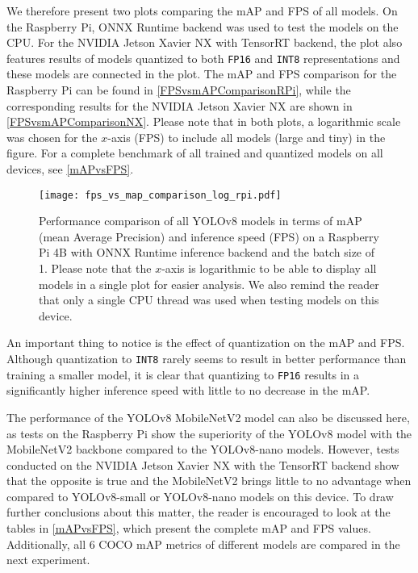 We therefore present two plots comparing the mAP and FPS of all models. On the
Raspberry Pi, ONNX Runtime backend was used to test the models on the CPU. For
the NVIDIA Jetson Xavier NX with TensorRT backend, the plot also features
results of models quantized to both \texttt{FP16} and \texttt{INT8}
representations and these models are connected in the plot. The mAP and FPS
comparison for the Raspberry Pi can be found in \autoref{FPSvsmAPComparisonRPi},
while the corresponding results for the NVIDIA Jetson Xavier NX are shown in
\autoref{FPSvsmAPComparisonNX}. Please note that in both plots, a logarithmic
scale was chosen for the $x$-axis (FPS) to include all models (large and tiny) in
the figure. For a complete benchmark of all trained and quantized models on all
devices, see \autoref{mAPvsFPS}.

\begin{figure}[t]
    \begin{framed}
        \centering
        \texttt{[image: fps\_vs\_map\_comparison\_log\_rpi.pdf]}
        \caption{Performance comparison of all YOLOv8 models in terms of mAP
        (mean Average Precision) and inference speed (FPS) on a Raspberry Pi 4B
        with ONNX Runtime inference backend and the batch size of 1. Please note
        that the $x$-axis is logarithmic to be able to display all models in a
        single plot for easier analysis. We also remind the reader that only a
        single CPU thread was used when testing models on this device.}
        \label{FPSvsmAPComparisonRPi}
    \end{framed}
\end{figure}

An important thing to notice is the effect of quantization on the mAP and FPS.
Although quantization to \texttt{INT8} rarely seems to result in better
performance than training a smaller model, it is clear that quantizing to
\texttt{FP16} results in a significantly higher inference speed with little to
no decrease in the mAP.

The performance of the YOLOv8 MobileNetV2 model can also be discussed here, as
tests on the Raspberry Pi show the superiority of the YOLOv8 model with the
MobileNetV2 backbone compared to the YOLOv8-nano models. However, tests
conducted on the NVIDIA Jetson Xavier NX with the TensorRT backend show that the
opposite is true and the MobileNetV2 brings little to no advantage when compared
to YOLOv8-small or YOLOv8-nano models on this device. To draw further
conclusions about this matter, the reader is encouraged to look at the tables in
\autoref{mAPvsFPS}, which present the complete mAP and FPS values. Additionally,
all 6 COCO mAP metrics of different models are compared in the next experiment.

